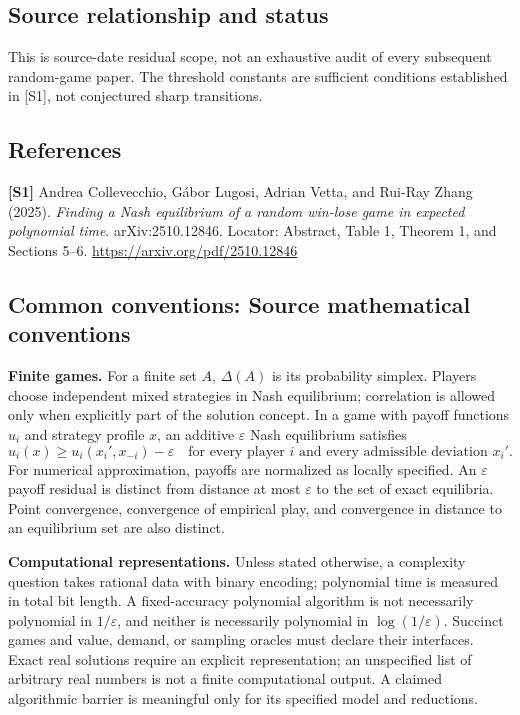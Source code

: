\documentclass[11pt,a4paper]{article}
\begin{document}
\subsection*{Source relationship and status}
This is source-date residual scope, not an exhaustive audit of every subsequent random-game paper. The threshold constants are sufficient conditions established in [S1], not conjectured sharp transitions.
\subsection*{References}
\begingroup\footnotesize\raggedright
{\footnotesize\raggedright
\textbf{[S1]} Andrea Collevecchio, G\'abor Lugosi, Adrian Vetta, and Rui-Ray Zhang (2025). \emph{Finding a Nash equilibrium of a random win-lose game in expected polynomial time}. arXiv:2510.12846. Locator: Abstract, Table 1, Theorem 1, and Sections 5--6. \url{https://arxiv.org/pdf/2510.12846}\par}
\par\endgroup

\subsection*{Common conventions: Source mathematical conventions}

\textbf{Finite games.} For a finite set $A$, $\Delta(A)$ is its probability
simplex. Players choose independent mixed strategies in Nash equilibrium;
correlation is allowed only when explicitly part of the solution concept.
In a game with payoff functions $u_i$ and strategy profile $x$, an additive
$\varepsilon$ Nash equilibrium satisfies
\[
 u_i(x)\geq u_i(x_i',x_{-i})-\varepsilon
 \quad\text{for every player $i$ and every admissible deviation $x_i'$}.
\]
For numerical approximation, payoffs are normalized as locally specified.
An $\varepsilon$ payoff residual is distinct from distance at most
$\varepsilon$ to the set of exact equilibria. Point convergence, convergence
of empirical play, and convergence in distance to an equilibrium set are
also distinct.

\textbf{Computational representations.} Unless stated otherwise, a complexity
question takes rational data with binary encoding; polynomial time is measured
in total bit length. A fixed-accuracy polynomial algorithm is not necessarily
polynomial in $1/\varepsilon$, and neither is necessarily polynomial in
$\log(1/\varepsilon)$. Succinct games and value, demand, or sampling oracles
must declare their interfaces. Exact real solutions require an explicit
representation; an unspecified list of arbitrary real numbers is not a
finite computational output. A claimed algorithmic barrier is meaningful
only for its specified model and reductions.
\end{document}
